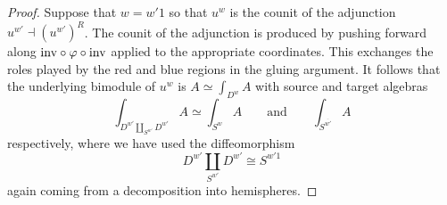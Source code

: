 \documentclass[10pt, reqno, twoside
, final
]{amsart}
\numberwithin{equation}{subsection}%
\theoremstyle{definition}
\theoremstyle{definition}
\theoremstyle{definition}
\theoremstyle{definition}
\theoremstyle{definition}
\theoremstyle{definition}
\theoremstyle{definition}
\theoremstyle{definition}
\theoremstyle{definition}
\theoremstyle{plain}
\theoremstyle{definition}
\theoremstyle{plain}
\theoremstyle{definition}
\theoremstyle{plain}
\theoremstyle{definition}
\theoremstyle{definition}
\theoremstyle{plain}
\theoremstyle{plain}
\theoremstyle{definition}
\theoremstyle{plain}
\theoremstyle{plain}
\theoremstyle{plain}
\begin{document}
\begin{proof}
Suppose that $w = w'1$ so that $u^w$ is the counit of the adjunction $u^{w'} \dashv (u^{w'})^R$. The counit of the adjunction is produced by pushing forward along $\mathrm{inv} \circ \varphi \circ \mathrm{inv}$ applied to the appropriate coordinates. This exchanges the roles played by the red and blue regions in the gluing argument. It follows that the underlying bimodule of $u^w$ is $A \simeq \int_{D^w} A$ with source and target algebras
\begin{equation}
     \int_{D^{w'} \coprod_{S^{w'}} D^{w'}} A \simeq \int_{S^{w}} A    \qquad \text{and} \qquad  \int_{S^{\overline{w'}}} A \label{eq:case1-3}
\end{equation}
respectively, where we have used the diffeomorphism
\begin{equation}
      D^{w'} \coprod_{S^{w'}} D^{w'} \cong S^{{w'}1}
\end{equation}
again coming from a decomposition into hemispheres.
\end{proof}
\end{document}
